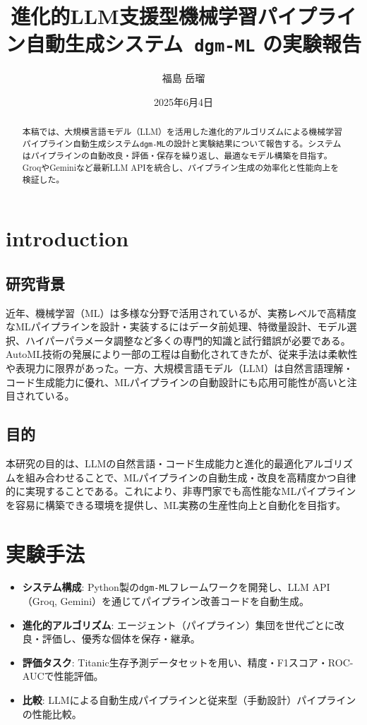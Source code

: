 \documentclass[a4paper,12pt]{article}
\title{進化的LLM支援型機械学習パイプライン自動生成システム\ \texttt{dgm-ML} の実験報告}
\author{福島 岳瑠}
\date{2025年6月4日}
\begin{document}
\maketitle

\begin{abstract}
本稿では、大規模言語モデル（LLM）を活用した進化的アルゴリズムによる機械学習パイプライン自動生成システム\texttt{dgm-ML}の設計と実験結果について報告する。システムはパイプラインの自動改良・評価・保存を繰り返し、最適なモデル構築を目指す。GroqやGeminiなど最新LLM APIを統合し、パイプライン生成の効率化と性能向上を検証した。
\end{abstract}

\section{introduction}
\subsection{研究背景}
近年、機械学習（ML）は多様な分野で活用されているが、実務レベルで高精度なMLパイプラインを設計・実装するにはデータ前処理、特徴量設計、モデル選択、ハイパーパラメータ調整など多くの専門的知識と試行錯誤が必要である。AutoML技術の発展により一部の工程は自動化されてきたが、従来手法は柔軟性や表現力に限界があった。一方、大規模言語モデル（LLM）は自然言語理解・コード生成能力に優れ、MLパイプラインの自動設計にも応用可能性が高いと注目されている。

\subsection{目的}
本研究の目的は、LLMの自然言語・コード生成能力と進化的最適化アルゴリズムを組み合わせることで、MLパイプラインの自動生成・改良を高精度かつ自律的に実現することである。これにより、非専門家でも高性能なMLパイプラインを容易に構築できる環境を提供し、ML実務の生産性向上と自動化を目指す。

\section{実験手法}
\begin{itemize}
  \item \textbf{システム構成}: Python製の\texttt{dgm-ML}フレームワークを開発し、LLM API（Groq, Gemini）を通じてパイプライン改善コードを自動生成。
  \item \textbf{進化的アルゴリズム}: エージェント（パイプライン）集団を世代ごとに改良・評価し、優秀な個体を保存・継承。
  \item \textbf{評価タスク}: Titanic生存予測データセットを用い、精度・F1スコア・ROC-AUCで性能評価。
  \item \textbf{比較}: LLMによる自動生成パイプラインと従来型（手動設計）パイプラインの性能比較。
\end{itemize}
\end{document}

